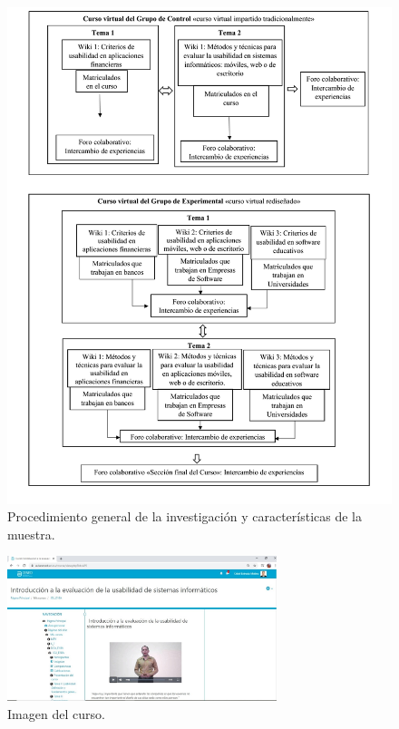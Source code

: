 \documentclass[spanish]{textolivre}
\begin{document}
\begin{figure}[htbp]
 \centering
 \includegraphics[width=1\textwidth]{fig1.png}
 \caption{Procedimiento general de la investigación y características de la muestra.}
 \label{fig1}
\end{figure}

\begin{figure}[htbp]
 \centering
 \includegraphics[width=0.7\textwidth]{fig2.png}
 \caption{Imagen del curso.}
 \label{fig2}
\end{figure}
\end{document}
